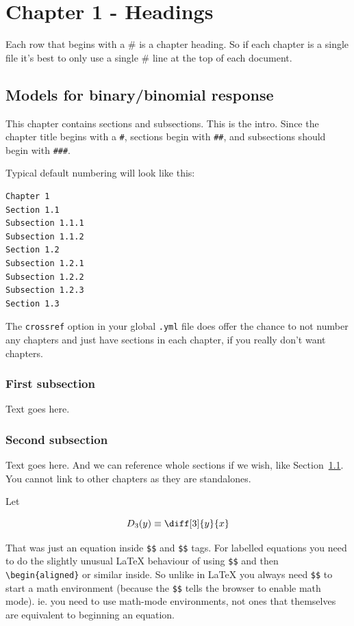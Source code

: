 \documentclass[
  a4paper,
  DIV=11,
  numbers=noendperiod,
  oneside]{scrreport}
\author{}
\date{}
\begin{document}
\chapter{Chapter 1 - Headings}\label{sec-headings}

Each row that begins with a \# is a chapter heading. So if each chapter
is a single file it's best to only use a single \# line at the top of
each document.

\section{Models for binary/binomial response}\label{sec-binary-response}

This chapter contains sections and subsections. This is the intro. Since
the chapter title begins with a \texttt{\#}, sections begin with
\texttt{\#\#}, and subsections should begin with \texttt{\#\#\#}.

Typical default numbering will look like this:

\begin{verbatim}
Chapter 1
Section 1.1
Subsection 1.1.1
Subsection 1.1.2
Section 1.2
Subsection 1.2.1
Subsection 1.2.2
Subsection 1.2.3
Section 1.3
\end{verbatim}

The \texttt{crossref} option in your global \texttt{.yml} file does
offer the chance to not number any chapters and just have sections in
each chapter, if you really don't want chapters.

\subsection{First subsection}\label{first-subsection}

Text goes here.

\subsection{Second subsection}\label{second-subsection}

Text goes here. And we can reference whole sections if we wish, like
Section~\ref{sec-binary-response}. You cannot link to other chapters as
they are standalones.

Let

\[D_3(y) \equiv \diff[3]{y}{x}\]

That was just an equation inside \texttt{\$\$} and \texttt{\$\$} tags.
For labelled equations you need to do the slightly unusual LaTeX
behaviour of using \texttt{\$\$} and then
\texttt{\textbackslash{}begin\{aligned\}} or similar inside. So unlike
in LaTeX you always need \texttt{\$\$} to start a math environment
(because the \texttt{\$\$} tells the browser to enable math mode). ie.
you need to use math-mode environments, not ones that themselves are
equivalent to beginning an equation.
\end{document}
